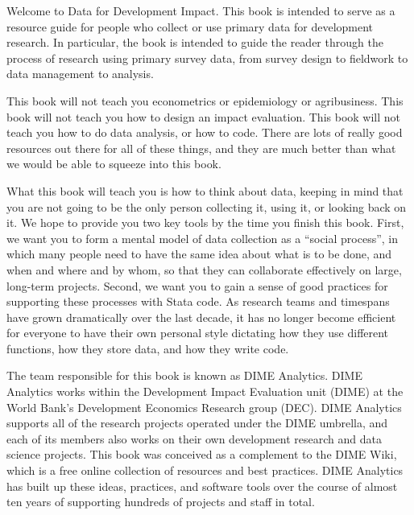 
Welcome to Data for Development Impact.
This book is intended to serve as a resource guide
for people who collect or use primary data for development research.
In particular, the book is intended to guide the reader
through the process of research using primary survey data,
from survey design to fieldwork to data management to analysis.

This book will not teach you econometrics or epidemiology or agribusiness.
This book will not teach you how to design an impact evaluation.
This book will not teach you how to do data analysis, or how to code.
There are lots of really good resources out there for all of these things,
and they are much better than what we would be able to squeeze into this book.

What this book will teach you is how to think about data,
keeping in mind that you are not going to be the only person
collecting it, using it, or looking back on it.
We hope to provide you two key tools by the time you finish this book.
First, we want you to form a mental model of data collection as a ``social process'',
in which many people need to have the same idea about what is to be done, and when and where and by whom,
so that they can collaborate effectively on large, long-term projects.
Second, we want you to gain a sense of good practices for supporting these processes with Stata code.
As research teams and timespans have grown dramatically over the last decade,
it has no longer become efficient for everyone to have their own personal style
dictating how they use different functions, how they store data, and how they write code.

The team responsible for this book is known as DIME Analytics. \cite{dimeanalytics}
DIME Analytics works within the Development Impact Evaluation unit (DIME) \cite{dime}
at the World Bank's Development Economics Research group (DEC). \cite{dec}
DIME Analytics supports all of the research projects operated under the DIME umbrella,
and each of its members also works on their own development research and data science projects.
This book was conceived as a complement to the DIME Wiki, \cite{dimewiki}
which is a free online collection of resources and best practices.
DIME Analytics has built up these ideas, practices, and software tools
over the course of almost ten years of supporting hundreds of projects and staff in total.

